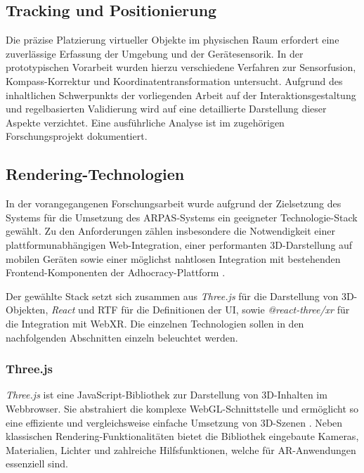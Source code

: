 \subsection{Tracking und Positionierung}

Die präzise Platzierung virtueller Objekte im physischen Raum erfordert eine zuverlässige Erfassung der Umgebung und der Gerätesensorik. In der prototypischen Vorarbeit wurden hierzu verschiedene Verfahren zur Sensorfusion, Kompass-Korrektur und Koordinatentransformation untersucht. Aufgrund des inhaltlichen Schwerpunkts der vorliegenden Arbeit auf der Interaktionsgestaltung und regelbasierten Validierung wird auf eine detaillierte Darstellung dieser Aspekte verzichtet. Eine ausführliche Analyse ist im zugehörigen Forschungsprojekt dokumentiert.

\subsection{Rendering-Technologien}

In der vorangegangenen Forschungsarbeit wurde aufgrund der Zielsetzung des Systems für die Umsetzung des ARPAS-Systems ein geeigneter Technologie-Stack gewählt. Zu den Anforderungen zählen insbesondere die Notwendigkeit einer plattformunabhängigen Web-Integration, einer performanten 3D-Darstellung auf mobilen Geräten sowie einer möglichst nahtlosen Integration mit bestehenden Frontend-Komponenten der Adhocracy-Plattform \parencite{liquiddemocracye.v.LiqdAdhocracyplus2025}.

Der gewählte Stack setzt sich zusammen aus \textit{Three.js} für die Darstellung von 3D-Objekten, \textit{React} und RTF für die Definitionen der UI, sowie \textit{@react-three/xr} für die Integration mit WebXR. Die einzelnen Technologien sollen in den nachfolgenden Abschnitten einzeln beleuchtet werden.

\subsubsection{Three.js}

\textit{Three.js} ist eine JavaScript-Bibliothek zur Darstellung von 3D-Inhalten im Webbrowser. Sie abstrahiert die komplexe WebGL-Schnittstelle und ermöglicht so eine effiziente und vergleichsweise einfache Umsetzung von 3D-Szenen \parencite{three.jsauthorsFundamentals2025}. Neben klassischen Rendering-Funktionalitäten bietet die Bibliothek eingebaute Kameras, Materialien, Lichter und zahlreiche Hilfsfunktionen, welche für AR-Anwendungen essenziell sind.

